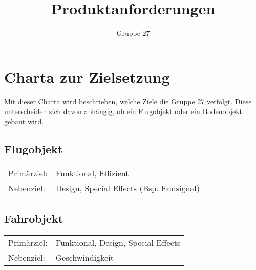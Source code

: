 \documentclass[a4paper,10pt,fleqn]{article}
\title{Produktanforderungen}
\author{Gruppe 27}
\begin{document}

\section*{Charta zur Zielsetzung}
Mit dieser Charta wird beschrieben, welche Ziele die Gruppe 27 verfolgt. 
Diese unterscheiden sich davon abhängig, ob ein Flugobjekt oder ein 
Bodenobjekt gebaut wird. 

\subsection*{Flugobjekt}
\begin{tabular}{@{}ll}
    Primärziel: & Funktional, Effizient \\
    Nebenziel:  & Design, Special Effects (Bsp. Endsignal)
\end{tabular}

\subsection*{Fahrobjekt}
\begin{tabular}{@{}ll}
    Primärziel: & Funktional, Design, Special Effects \\
    Nebenziel:  & Geschwindigkeit
\end{tabular}
\end{document}
